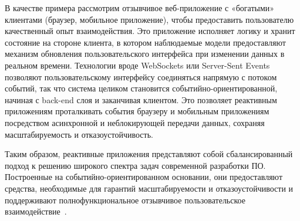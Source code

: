 В качестве примера рассмотрим отзывчивое веб-приложение с «богатыми» клиентами (браузер, мобильное приложение), чтобы предоставить пользователю качественный опыт взаимодействия. Это приложение исполняет логику и хранит состояние на стороне клиента, в котором наблюдаемые модели предоставляют механизм обновления пользовательского интерфейса при изменении данных в реальном времени. Технологии вроде WebSockets или Server-Sent Events позволяют пользовательскому интерфейсу соединяться напрямую с потоком событий, так что система целиком становится событийно-ориентированной, начиная с back-end слоя и заканчивая клиентом. Это позволяет реактивным приложениям проталкивать события браузеру и мобильным приложениям посредством асинхронной и неблокирующей передачи данных, сохраняя масштабируемость и отказоустойчивость.

Таким образом, реактивные приложения представляют собой сбалансированный подход к решению широкого спектра задач современной разработки ПО. Построенные на событийно-ориентированном основании, они предоставляют средства, необходимые для гарантий масштабируемости и отказоустойчивости и поддерживают полнофункциональное отзывчивое пользовательское взаимодействие~\cite{reactive_manifesto}.
